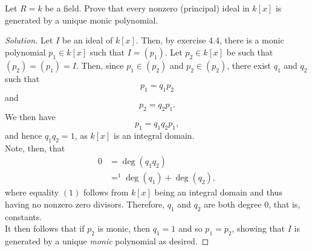\documentclass[12pt]{article}
\newenvironment{problem}[2][Problem]{\begin{trivlist}
\item[\hskip \labelsep {\bfseries #1}\hskip \labelsep {\bfseries #2.}]}{\end{trivlist}}
\newenvironment{solution}
  {\renewcommand\qedsymbol{$\blacksquare$}\begin{proof}[Solution]}
{\end{proof}}
\theoremstyle{remark}
\begin{document}
\begin{problem}{4.7}
  Let $R=k$ be a field.
  Prove that every nonzero (principal) ideal in $k[x]$ is generated
  by a unique monic polynomial.
\end{problem}
\begin{solution}
  Let $I$ be an ideal of $k[x]$.
  Then, by exercise 4.4, there is a monic polynomial $p_1\in k[x]$ such
  that $I=(p_1)$.
  Let $p_2\in k[x]$ be such that $(p_2)=(p_1)=I$.
  Then, since $p_1\in (p_2)$ and $p_2\in (p_2)$, there exist $q_1$
  and $q_2$ such that $$p_1=q_1p_2$$ and $$p_2=q_2p_1.$$
  We then have $$p_1=q_1q_2p_1,$$ and hence $q_1q_2=1$, as $k[x]$
  is an integral domain.\\
  \indent Note, then, that 
  \begin{align*}
    0 &= \deg(q_1q_2)\\
    &=^1 \deg(q_1)+\deg(q_2),
  \end{align*}
  where equality $(1)$ follows from $k[x]$ being an integral domain and thus
  having no nonzero zero divisors.
  Therefore, $q_1$ and $q_2$ are both degree 0, that is, constants. \\
  \indent It then follows that if $p_2$ is monic, then $q_1 = 1$ and
  so $p_1=p_2$, showing that $I$ is generated by a unique \textit{monic}
  polynomial as desired.
\end{solution}
\end{document}
